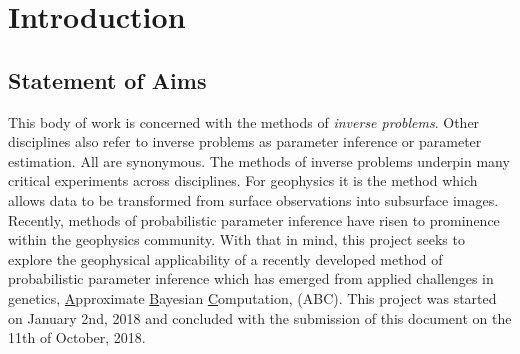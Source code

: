 
\chapter{Introduction}

\section{Statement of Aims}


This body of work is concerned with the methods of \textit{inverse problems}. Other disciplines also refer to inverse problems as parameter inference or parameter estimation. All are synonymous. The methods of inverse problems underpin many critical experiments across disciplines. For geophysics it is the method which allows data to be transformed from surface observations into subsurface images. Recently, methods of probabilistic parameter inference have risen to prominence within the geophysics community. With that in mind, this project seeks to explore the geophysical applicability of a recently developed method of probabilistic parameter inference which has emerged from applied challenges in genetics, \underline{A}pproximate \underline{B}ayesian \underline{C}omputation, (ABC). This project was started on January 2nd, 2018 and concluded with the submission of this document on the 11th of October, 2018.

